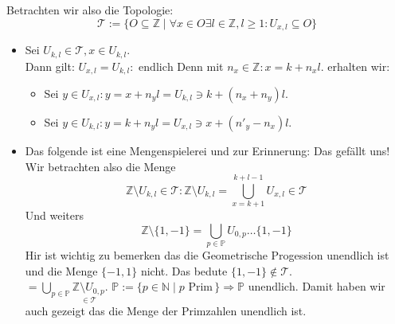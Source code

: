 Betrachten wir also die Topologie:
$$\mathcal{T} := \{ O \subseteq \mathbb{Z} \mid \forall x \in O \exists l \in \mathbb{Z}, l \ge 1 : U_{x,l} \subseteq O\}$$
\begin{itemize}
    \item Sei $U_{k,l} \in \mathcal{T}, x \in U_{k,l}$. \\
    Dann gilt: $U_{x,l}=U_{k,l} : \text{ endlich}$
    Denn mit $n_x \in \mathbb{Z}: x = k + n_x l$. erhalten wir: \\
    \begin{itemize}
        \item Sei $y \in U_{x,l}: y = x + n_y l = U_{k,l} \ni k + (n_x + n_y)l$.
        \item Sei $y \in U_{k,l}: y = k + n_y l = U_{x,l} \ni x + (n'_y - n_{x})l$.
    \end{itemize}

    \item Das folgende ist eine Mengenspielerei und zur Erinnerung: Das gefällt uns!\\
    Wir betrachten also die Menge $$\mathbb{Z} \setminus U_{k,l} \in \mathcal{T}: \mathbb{Z} \setminus U_{k,l} 
    = \underset{x= k+1}{\overset{k+l-1}{\bigcup}} U_{x,l} \in \mathcal{T}$$
    Und weiters 
    $$\mathbb{Z}\setminus\{1,-1\} = \underset{p \in \mathbb{P}}{\bigcup} U_{0,p} \dots \{1,-1\}$$
    Hir ist wichtig zu bemerken das die Geometrische Progession unendlich ist und die Menge $\{-1,1\}$ nicht. 
    Das bedute $\{1,-1\} \notin \mathcal{T}$.\\
    $= \underset{p \in \mathbb{P}}{\bigcup}\underset{\in \mathcal{T}}{\mathbb{Z}\setminus{U_{0,p}}}$. 
    $\mathbb{P}:= \{p \in \mathbb{N} \mid p \text{ Prim} \,\} \Rightarrow \mathbb{P} \text{ unendlich}$.
    Damit haben wir auch gezeigt das die Menge der Primzahlen unendlich ist.
    
\end{itemize}


